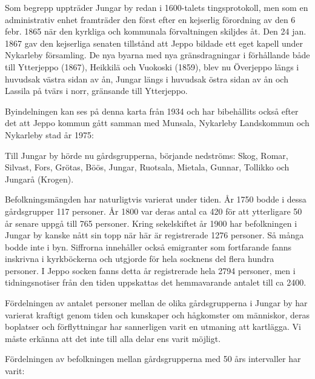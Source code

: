 
Som begrepp uppträder Jungar by redan i 1600-talets tingsprotokoll, men som en administrativ enhet framträder den först efter en kejserlig förordning av den 6 febr. 1865 när den kyrkliga och kommunala förvaltningen skiljdes åt. Den 24 jan. 1867 gav den kejserliga senaten tillstånd att Jeppo bildade ett eget kapell under Nykarleby församling. De nya byarna med nya gränsdragningar i förhållande både till Ytterjeppo (1867), Heikkilä och Vuokoski (1859), blev nu Överjeppo längs i huvudsak västra sidan av ån, Jungar längs i huvudsak östra sidan av ån och Lassila på tvärs i norr, gränsande till Ytterjeppo.

Byindelningen kan ses på denna karta från 1934 och har bibehållits också efter det att Jeppo kommun gått samman med Munsala, Nykarleby Landskommun och Nykarleby stad år 1975:


Till Jungar by hörde nu gårdsgrupperna, börjande nedströms: Skog, Romar, Silvast, Fors, Grötas, Böös, Jungar, Ruotsala, Mietala, Gunnar, Tollikko och Jungarå (Krogen).

Befolkningsmängden har naturligtvis varierat under tiden. År 1750 bodde i dessa gårdsgrupper 117 personer. År 1800 var deras antal ca 420 för att ytterligare 50 år senare uppgå till 765 personer. Kring sekelskiftet år 1900 har befolkningen i Jungar by kanske nått sin topp när här är registrerade 1276 personer. Så många bodde inte i byn. Siffrorna innehåller också emigranter som fortfarande fanns inskrivna i kyrkböckerna och utgjorde för hela socknens del flera hundra personer. I Jeppo socken fanns detta år registrerade hela 2794 personer, men i tidningsnotiser från den tiden uppskattas det hemmavarande antalet till ca 2400.

Fördelningen av antalet personer mellan de olika gårdsgrupperna i Jungar by har varierat kraftigt genom tiden och kunskaper och hågkomster om människor, deras boplatser och förflyttningar har sannerligen varit en utmaning att kartlägga. Vi måste erkänna att det inte till alla delar ens varit möjligt.

Fördelningen av befolkningen mellan gårdsgrupperna med 50 års intervaller har varit:

